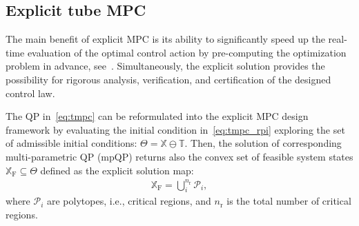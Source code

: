 \documentclass[letterpaper, 10 pt, conference]{ieeeconf}
\begin{document}
	\subsection{Explicit tube MPC}
	\label{sec:explicit_mpc}
	
	The main benefit of explicit MPC is its ability to significantly speed up the real-time evaluation of the optimal control action by pre-computing the optimization problem in advance, see~\cite{BM02}. Simultaneously, the explicit solution provides the possibility for rigorous analysis, verification, and certification of the designed control law. 
	
	The QP in~\eqref{eq:tmpc} can be reformulated into the explicit MPC design framework by evaluating the initial condition in~\eqref{eq:tmpc_rpi} exploring the set of admissible initial conditions: $\Theta = \mathbb{X} \ominus \mathbb{T}$. Then, the solution of corresponding multi-parametric QP (mpQP) returns also the convex set of feasible system states $\mathbb{X}_{\mathrm{F}} \subseteq \Theta$ defined as the explicit solution map:
	\begin{eqnarray}
		\label{eq:tmpc_partition}
		\mathbb{X}_{\mathrm{F}} = \bigcup_{i}^{n_{\mathrm{r}}} \mathcal{P}_{i} ,
	\end{eqnarray}
	where $\mathcal{P}_{i}$ are polytopes, i.e., critical regions, and $n_{\mathrm{r}}$ is the total number of critical regions.
	
\end{document}
